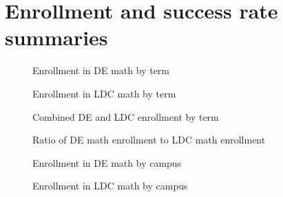 \chapter{Enrollment and success rate summaries}\label{sec:app:enrollment}

\begin{figure}[!htb]
  \begin{widepage}
      \begin{minipage}[t]{.45\textwidth}
    	 \centering
          
          \caption{Enrollment in DE math by term}
    \end{minipage}%
    \hspace{1em}
    \begin{minipage}[t]{.45\textwidth}
    	 \centering
          
          \caption{Enrollment in LDC math by term}
    \end{minipage}
  \end{widepage}
\end{figure}

\begin{figure}[!htb]
  \begin{widepage}
    \begin{minipage}[t]{.45\textwidth}
    	 \centering
          
          \caption{Combined DE and LDC enrollment by term}
          \label{app:fig:totalenrollmentTerm}
    \end{minipage}%
    \hspace{1em}
    \begin{minipage}[t]{.45\textwidth}
    	 \centering
         
          \caption{Ratio of DE math enrollment to LDC math enrollment}
          \label{app:fig:ratioDevelopToLDC}
    \end{minipage}
  \end{widepage}
\end{figure}

\begin{figure}[!htb]
  \begin{widepage}
    \begin{minipage}[t]{.45\textwidth}
    	 \centering
          
          \caption{Enrollment in DE math by campus}
          \label{app:fig:enrollmentDevelopCampus}
   \end{minipage}%
    \hspace{1em}
    \begin{minipage}[t]{.45\textwidth}
     	 \centering
          
          \caption{Enrollment in LDC math by campus}
          \label{app:fig:enrollmentLDCCampus}
   \end{minipage}
  \end{widepage}
\end{figure}

